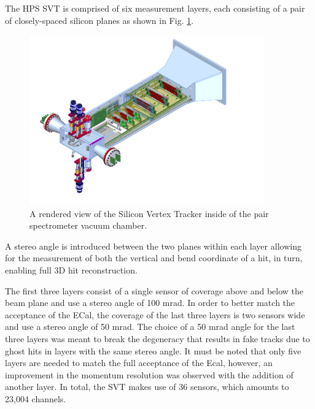 The HPS SVT is comprised of six measurement layers, each consisting of a pair of
closely-spaced silicon planes as shown in Fig. \ref{fig:svt_layout_render}.
\begin{figure}[h]
    \centering
    \includegraphics[width=0.9\textwidth]{images/svt_layout_render.png}
    \caption{A rendered view of the Silicon Vertex Tracker inside of the pair
             spectrometer vacuum chamber.}
    \label{fig:svt_layout_render}
\end{figure}
A stereo angle is introduced between the two planes within each layer allowing
for the measurement of both the vertical and bend coordinate of a hit, in turn, 
enabling full 3D hit reconstruction.  

The first three layers consist of a single sensor of coverage above and below
the beam plane and use a stereo angle of 100 mrad. In order to better match the
acceptance of the ECal, the coverage of the last three layers is two sensors 
wide and use a stereo angle of 50 mrad.  The choice of a 50 mrad angle for the
last three layers was meant to break the degeneracy that results in fake tracks
due to ghost hits in layers with the same stereo angle.  It must be noted that
only five layers are needed to match the full acceptance of the Ecal, however,
an improvement in the momentum resolution was observed with the addition of 
another layer.  In total, the SVT makes use of 36 sensors, which amounts to 
23,004 channels.

